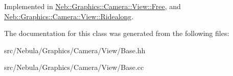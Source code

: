 \-Implemented in \hyperlink{classNeb_1_1Graphics_1_1Camera_1_1View_1_1Free_a735e8aa6d1a5d9bfd925fc6a4192b3ba}{\-Neb\-::\-Graphics\-::\-Camera\-::\-View\-::\-Free}, and \hyperlink{classNeb_1_1Graphics_1_1Camera_1_1View_1_1Ridealong_ad78d68a7381289731d6f066f4f7e1e8d}{\-Neb\-::\-Graphics\-::\-Camera\-::\-View\-::\-Ridealong}.



\-The documentation for this class was generated from the following files\-:\begin{DoxyCompactItemize}
\item 
src/\-Nebula/\-Graphics/\-Camera/\-View/\-Base.\-hh\item 
src/\-Nebula/\-Graphics/\-Camera/\-View/\-Base.\-cc\end{DoxyCompactItemize}
